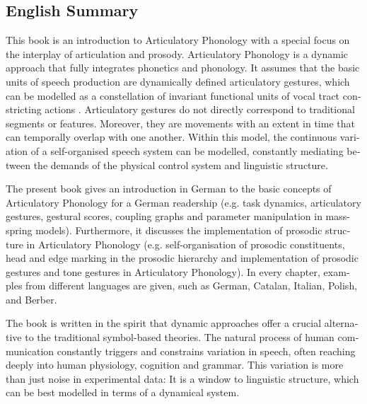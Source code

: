\begin{otherlanguage}{english}
\chapter{English Summary}
\label{chap:08}

This book is an introduction to Articulatory Phonology with a special focus on the interplay of articulation and prosody. Articulatory Phonology is a dynamic approach that fully integrates phonetics and phonology. It assumes that the basic units of speech production are dynamically defined articulatory gestures, which can be modelled as a constellation of invariant functional units of vocal tract constricting actions \citep[see][]{Fowler1980, Browman1986, Browman1988, Saltzman1989, Browman1991a, Goldstein2009}. Articulatory gestures do not directly correspond to traditional segments or features. Moreover, they are movements with an extent in time that can temporally overlap with one another. Within this model, the continuous variation of a self-organised speech system can be modelled, constantly mediating between the demands of the physical control system and linguistic structure.

The present book gives an introduction in German to the basic concepts of Articulatory Phonology for a German readership (e.g. task dynamics, articulatory gestures, gestural scores, coupling graphs and parameter manipulation in mass-spring models). Furthermore, it discusses the implementation of prosodic structure in Articulatory Phonology (e.g. self-organisation of prosodic constituents, head and edge marking in the prosodic hierarchy and implementation of prosodic gestures and tone gestures in Articulatory Phonology). In every chapter, examples from different languages are given, such as German, Catalan, Italian, Polish,  and  Berber.

The book is written in the spirit that dynamic approaches offer a crucial alternative to the traditional symbol-based theories. The natural process of human communication constantly triggers and constrains variation in speech, often reaching deeply into human physiology, cognition and grammar. This variation is more than just noise in experimental data: It is a window to linguistic structure, which can be best modelled in terms of a dynamical system.


\end{otherlanguage}
